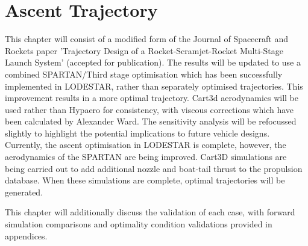 
\cleardoublepage
\chapter{Ascent Trajectory}\label{chapter:Ascent}

This chapter will consist of a modified form of the Journal of Spacecraft and Rockets paper 'Trajectory Design of a Rocket-Scramjet-Rocket Multi-Stage
Launch System' (accepted for publication). The results will be updated to use a combined SPARTAN/Third stage optimisation which has been successfully implemented in LODESTAR, rather than separately optimised trajectories. This improvement results in a more optimal trajectory. Cart3d aerodynamics will be used rather than Hypaero for consistency, with viscous corrections which have been calculated by Alexander Ward. The sensitivity analysis will be refocussed slightly to highlight the potential implications to future vehicle designs. 
Currently, the ascent optimisation in LODESTAR is complete, however, the aerodynamics of the SPARTAN are being improved. Cart3D simulations are being carried out to add additional nozzle and boat-tail thrust to the propulsion database. When these simulations are complete, optimal trajectories will be generated. 

This chapter will additionally discuss the validation of each case, with forward simulation comparisons and optimality condition validations provided in appendices. 
